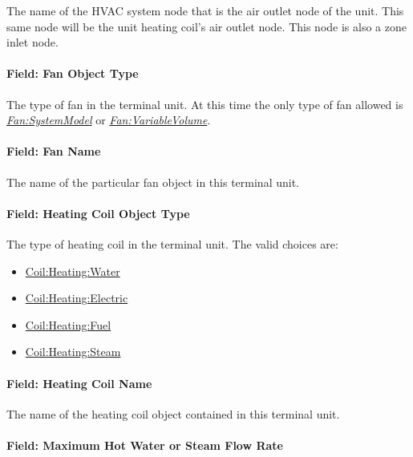 The name of the HVAC system node that is the air outlet node of the unit. This same node will be the unit heating coil's air outlet node. This node is also a zone inlet node.

\paragraph{Field: Fan Object Type}\label{field-fan-object-type}

The type of fan in the terminal unit. At this time the only type of fan allowed is \emph{\hyperref[fansystemmodel]{Fan:SystemModel}} or \emph{\hyperref[fanvariablevolume]{Fan:VariableVolume}}.

\paragraph{Field: Fan Name}\label{field-fan-name}

The name of the particular fan object in this terminal unit.

\paragraph{Field: Heating Coil Object Type}\label{field-heating-coil-object-type}

The type of heating coil in the terminal unit. The valid choices are:

\begin{itemize}
\item
  \hyperref[coilheatingwater]{Coil:Heating:Water}
\item
  \hyperref[coilheatingelectric]{Coil:Heating:Electric}
\item
  \hyperref[coilheatinggas-000]{Coil:Heating:Fuel}
\item
  \hyperref[coilheatingsteam]{Coil:Heating:Steam}
\end{itemize}

\paragraph{Field: Heating Coil Name}\label{field-heating-coil-name}

The name of the heating coil object contained in this terminal unit.

\paragraph{Field: Maximum Hot Water or Steam Flow Rate}\label{field-maximum-hot-water-or-steam-flow-rate-2}

